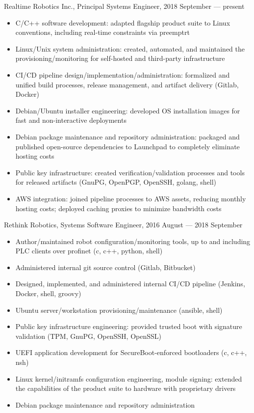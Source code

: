 \documentclass[letterpaper,11pt]{article}
\begin{document}
Realtime Robotics Inc., Principal Systems Engineer, 2018 September --- present

\begin{itemize}
\item C/C++ software development: adapted flagship product suite to Linux
  conventions, including real-time constraints via preemptrt
\item Linux/Unix system administration: created, automated, and maintained the
  provisioning/monitoring for self-hosted and third-party infrastructure
\item CI/CD pipeline design/implementation/administration: formalized and
  unified build processes, release management, and artifact delivery (Gitlab,
  Docker)
\item Debian/Ubuntu installer engineering: developed OS installation images for
  fast and non-interactive deployments
\item Debian package maintenance and repository administration: packaged and
  published open-source dependencies to Launchpad to completely eliminate
  hosting costs
\item Public key infrastructure: created verification/validation processes and
  tools for released artifacts (GnuPG, OpenPGP, OpenSSH, golang, shell)
\item AWS integration: joined pipeline processes to AWS assets, reducing
  monthly hosting costs; deployed caching proxies to minimize bandwidth costs
\end{itemize}

Rethink Robotics, Systems Software Engineer, 2016 August --- 2018 September

\begin{itemize}
\item Author/maintained robot configuration/monitoring tools, up to and
  including PLC clients over profinet (c, c++, python, shell)
\item Administered internal git source control (Gitlab, Bitbucket)
\item Designed, implemented, and administered internal CI/CD pipeline (Jenkins,
  Docker, shell, groovy)
\item Ubuntu server/workstation provisioning/maintenance (ansible, shell)
\item Public key infrastructure engineering: provided trusted boot with
  signature validation (TPM, GnuPG, OpenSSH, OpenSSL)
\item UEFI application development for SecureBoot-enforced bootloaders (c, c++,
  nsh)
\item Linux kernel/initramfs configuration engineering, module signing:
  extended the capabilities of the product suite to hardware with proprietary
  drivers
\item Debian package maintenance and repository administration
\end{itemize}
\end{document}
